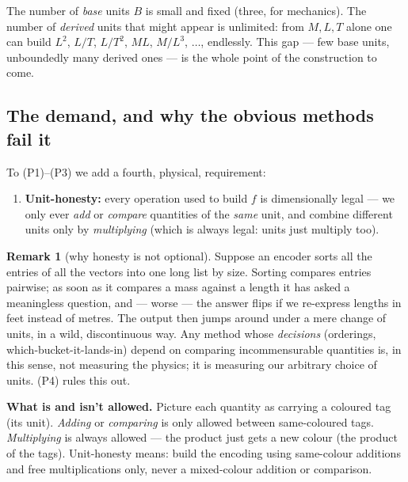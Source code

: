 \documentclass[11pt,a4paper]{article}
\theoremstyle{definition}
\newtheorem{remark}[definition]{Remark}
\theoremstyle{plain}
\begin{document}
\noindent
The number of \emph{base} units $B$ is small and fixed (three, for mechanics).
The number of \emph{derived} units that might appear is unlimited: from $M,L,T$
alone one can build $L^2$, $L/T$, $L/T^2$, $ML$, $M/L^3$, $\ldots$, endlessly.
This gap --- few base units, unboundedly many derived ones --- is the whole point
of the construction to come.

\subsection{The demand, and why the obvious methods fail it}

To (P1)--(P3) we add a fourth, physical, requirement:
\begin{enumerate}[label=\textbf{(P\arabic*)},leftmargin=*,start=4]
\item \textbf{Unit-honesty:} every operation used to build $f$ is dimensionally
      legal --- we only ever \emph{add} or \emph{compare} quantities of the
      \emph{same} unit, and combine different units only by \emph{multiplying}
      (which is always legal: units just multiply too).
\end{enumerate}

\begin{remark}[why honesty is not optional]\label{rmk:whyhonest}
Suppose an encoder sorts all the entries of all the vectors into one long list by
size. Sorting compares entries pairwise; as soon as it compares a mass against a
length it has asked a meaningless question, and --- worse --- the answer flips if
we re-express lengths in feet instead of metres. The output then jumps around
under a mere change of units, in a wild, discontinuous way. Any method whose
\emph{decisions} (orderings, which-bucket-it-lands-in) depend on comparing
incommensurable quantities is, in this sense, not measuring the physics; it is
measuring our arbitrary choice of units. (P4) rules this out.
\end{remark}

\begin{tcolorbox}[ideabox]
\textbf{What is and isn't allowed.} Picture each quantity as carrying a coloured
tag (its unit). \emph{Adding} or \emph{comparing} is only allowed between
same-coloured tags. \emph{Multiplying} is always allowed --- the product just
gets a new colour (the product of the tags). Unit-honesty means: build the
encoding using same-colour additions and free multiplications only, never a
mixed-colour addition or comparison.
\end{tcolorbox}
\end{document}
